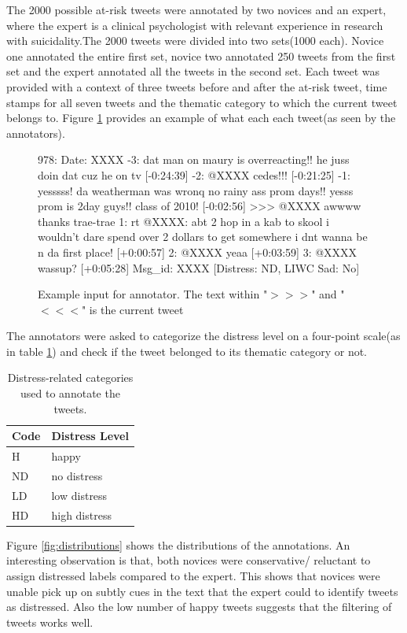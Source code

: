 The 2000 possible at-risk tweets were annotated by two novices and an expert, where the expert is a clinical psychologist with relevant experience in research with suicidality.The 2000 tweets were divided into two sets(1000 each). Novice one annotated the entire first set, novice two annotated 250 tweets from the first set and the expert annotated all the tweets in the second set. Each tweet was provided with a context of three tweets before and after the at-risk tweet, time stamps for all seven tweets and the thematic category to which the current tweet belongs to. Figure \ref{fig:example} provides an example of what each each tweet(as seen by the annotators). 
\begin{figure}[h]
\fontsize{9}{4}\selectfont 
\begin{centerverbatim}
978: Date: XXXX 
    -3: dat man on maury is overreacting!!
        he juss doin dat cuz he on 
        tv [-0:24:39]
    -2: @XXXX cedes!!! [-0:21:25]
    -1: yesssss! da weatherman was wronq 
        no rainy ass prom days!! yesss 
         prom is 2day guys!! class 
         of 2010! [-0:02:56]
>>> @XXXX awwww thanks trae-trae
     1: rt @XXXX: abt 2 hop in a kab 
        to skool i wouldn't dare spend 
        over 2 dollars to get somewhere
        i dnt wanna be n da first
        place! [+0:00:57]
     2: @XXXX yeaa [+0:03:59]
     3: @XXXX wassup? [+0:05:28]
Msg_id: XXXX  [Distress: ND, LIWC Sad: No]
\end{centerverbatim}
 \caption{Example input for annotator. The text within  "$>>>$" and "$<<<$"  is the current tweet}
 \label{fig:example}
\end{figure}
The annotators were asked to categorize the distress level on a four-point scale(as in table \ref{tab:distress}) and check if the tweet belonged to its thematic category or not. 
\begin{table}[h]
  \centering
  \begin{tabular}[h]{ll}
   \textbf{Code}&\textbf{Distress Level}\\
\hline
 H & happy \\
ND & no distress\\
 LD & low distress\\
HD &high distress
  \end{tabular}
  \caption{Distress-related categories used to annotate the tweets.}
  \label{tab:distress}
\end{table}
 Figure \ref{fig:distributions} shows the distributions of the annotations. An interesting observation is that, both novices were conservative/ reluctant to assign distressed labels compared to the expert. This shows that novices were unable pick up on subtly cues in the text that the expert could to identify tweets as distressed. Also the low number of happy tweets suggests that the filtering of tweets works well.



